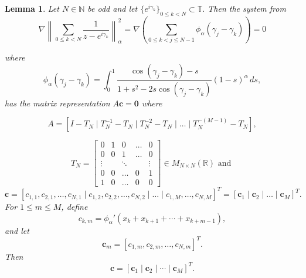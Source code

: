 \documentclass{article}
\newtheorem{lemma}[theorem]{Lemma}
\begin{document}
\begin{lemma}
    Let $N\in \mathbb{N}$ be odd and let $\{e^{i\gamma_k}\}_{0\leq k < N} \subset \mathbb{T}.$ Then   the system from     
    \[
\nabla\left \|\sum_{0 \leq k < N} \frac{1}{z - e^{i \gamma_k}}\right\|^2_\alpha = \nabla \left( \sum_{0 \leq k < j \leq N-1} \phi_\alpha (\gamma_j - \gamma_k)\right)=0\]

 where $$\phi_\alpha (\gamma_j - \gamma_k) = \int_0^1
\frac{\cos(\gamma_j - \gamma_k)- s}
{1 + s^2 - 2s \cos(\gamma_j - \gamma_k)}(1 - s)^\alpha \, ds, $$
has the matrix representation $A\mathbf{c}=\mathbf{0}$ where

$$A=\left[ I - T_N \mid T_N^{-1} - T_N \mid T_N^{-2} - T_N \mid \dots \mid T_N^{-(M-1)} - T_N \right],$$

$$T_N= \begin{bmatrix} 0 & 1 & 0 & \dots & 0 \\ 0 & 0 & 1 & \dots & 0 \\ \vdots & & \ddots & & \vdots  \\ 0 & 0 & \dots & 0 & 1 \\ 1 & 0 & \dots & 0 & 0 \end{bmatrix} \in M_{N\times N}(\mathbb{R}) \text{ and } $$
$$\mathbf{c}= \left[c_{1,1}, c_{2,1}, \dots, c_{N,1} \mid c_{1,2}, c_{2,2}, \dots, c_{N, 2} \mid \dots \mid c_{1,M}, \dots, c_{N,M}\right]^T =[\mathbf{c}_1 \mid \mathbf{c}_2 \mid \dots \mid \mathbf{c}_M]^T.$$
For $1\leq m\leq M$, define
\[
c_{k,m}
=
\phi_\alpha'
\left(
x_k+x_{k+1}+\cdots+x_{k+m-1}
\right),
\]
and let
\[
\mathbf{c}_m
=
[c_{1,m},c_{2,m},\dots,c_{N,m}]^T.
\]
Then
\[
\mathbf{c}
=
[\mathbf{c}_1\mid\mathbf{c}_2\mid\cdots\mid\mathbf{c}_M]^T.
\]
\end{lemma}


\end{document}
